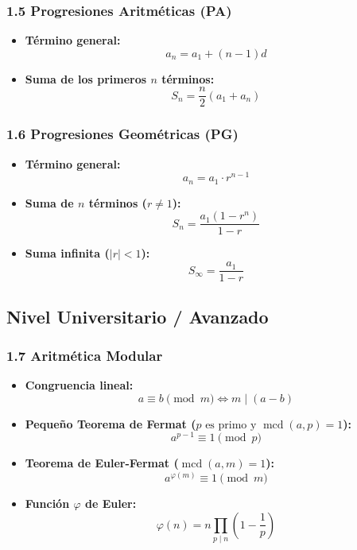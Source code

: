 \documentclass[11pt,a4paper]{article}
\begin{document}
\subsubsection*{1.5 Progresiones Aritméticas (PA)}

\begin{itemize}
  \item \textbf{Término general:}
  \[
    a_n = a_1 + (n - 1)d
  \]
  \item \textbf{Suma de los primeros $n$ términos:}
  \[
    S_n = \frac{n}{2} (a_1 + a_n)
  \]
\end{itemize}

\subsubsection*{1.6 Progresiones Geométricas (PG)}

\begin{itemize}
  \item \textbf{Término general:}
  \[
    a_n = a_1 \cdot r^{n - 1}
  \]
  \item \textbf{Suma de $n$ términos ($r \ne 1$):}
  \[
    S_n = \frac{a_1 (1 - r^n)}{1 - r}
  \]
  \item \textbf{Suma infinita ($|r| < 1$):}
  \[
    S_\infty = \frac{a_1}{1 - r}
  \]
\end{itemize}

\subsection*{Nivel Universitario / Avanzado}

\subsubsection*{1.7 Aritmética Modular}

\begin{itemize}
  \item \textbf{Congruencia lineal:}
  \[
    a \equiv b \pmod{m} \iff m \mid (a - b)
  \]
  \item \textbf{Pequeño Teorema de Fermat ($p \text{ es primo y } \operatorname{mcd}(a, p) = 1$):}
  \[
    a^{p - 1} \equiv 1 \pmod{p}
  \]
  \item \textbf{Teorema de Euler-Fermat ($\operatorname{mcd}(a, m) = 1$):}
  \[
    a^{\varphi(m)} \equiv 1 \pmod{m}
  \]
  \item \textbf{Función $\varphi$ de Euler:}
  \[
    \varphi(n) = n \prod_{p \mid n} \left(1 - \frac{1}{p}\right)
  \]
\end{itemize}
\end{document}
